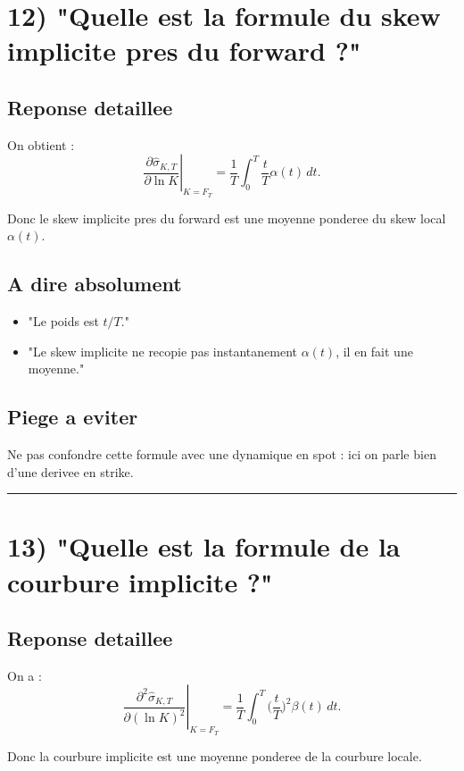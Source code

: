 \documentclass[11pt,a4paper]{article}
\begin{document}
\section{12) "Quelle est la formule du skew implicite pres du forward ?"}

\subsection{Reponse detaillee}

On obtient :
\[
\left.\frac{\partial \hat{\sigma}_{K,T}}{\partial \ln K}\right|_{K=F_T}
=
\frac{1}{T}\int_0^T \frac{t}{T}\alpha(t)\,dt.
\]

Donc le skew implicite pres du forward est une moyenne ponderee du skew local \(\alpha(t)\).

\subsection{A dire absolument}

\begin{itemize}
\item "Le poids est \(t/T\)."
\item "Le skew implicite ne recopie pas instantanement \(\alpha(t)\), il en fait une moyenne."
\end{itemize}

\subsection{Piege a eviter}

Ne pas confondre cette formule avec une dynamique en spot : ici on parle bien d'une derivee en strike.

\bigskip\hrule\bigskip

\section{13) "Quelle est la formule de la courbure implicite ?"}

\subsection{Reponse detaillee}

On a :
\[
\left.\frac{\partial^2 \hat{\sigma}_{K,T}}{\partial (\ln K)^2}\right|_{K=F_T}
=
\frac{1}{T}\int_0^T \Big(\frac{t}{T}\Big)^2\beta(t)\,dt.
\]

Donc la courbure implicite est une moyenne ponderee de la courbure locale.
\end{document}
